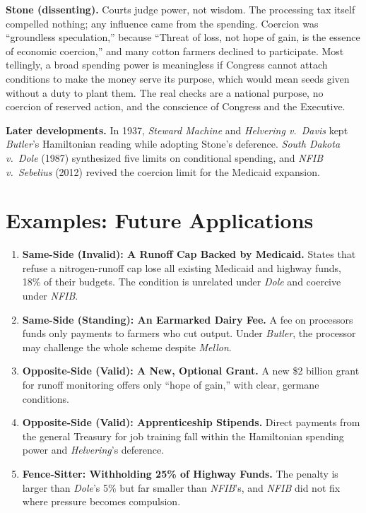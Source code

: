 \documentclass[12pt]{article}
\begin{document}
\textbf{Stone (dissenting).} Courts judge power, not wisdom. The processing tax itself compelled nothing; any influence came from the spending. Coercion was ``groundless speculation,'' because ``Threat of loss, not hope of gain, is the essence of economic coercion,'' and many cotton farmers declined to participate. Most tellingly, a broad spending power is meaningless if Congress cannot attach conditions to make the money serve its purpose, which would mean seeds given without a duty to plant them. The real checks are a national purpose, no coercion of reserved action, and the conscience of Congress and the Executive.

\textbf{Later developments.} In 1937, \textit{Steward Machine} and \textit{Helvering v.\ Davis} kept \textit{Butler}'s Hamiltonian reading while adopting Stone's deference. \textit{South Dakota v.\ Dole} (1987) synthesized five limits on conditional spending, and \textit{NFIB v.\ Sebelius} (2012) revived the coercion limit for the Medicaid expansion.

\section{Examples: Future Applications}

\begin{enumerate}
\item \textbf{Same-Side (Invalid): A Runoff Cap Backed by Medicaid.} States that refuse a nitrogen-runoff cap lose all existing Medicaid and highway funds, 18\% of their budgets. The condition is unrelated under \textit{Dole} and coercive under \textit{NFIB}.
\item \textbf{Same-Side (Standing): An Earmarked Dairy Fee.} A fee on processors funds only payments to farmers who cut output. Under \textit{Butler}, the processor may challenge the whole scheme despite \textit{Mellon}.
\item \textbf{Opposite-Side (Valid): A New, Optional Grant.} A new \$2 billion grant for runoff monitoring offers only ``hope of gain,'' with clear, germane conditions.
\item \textbf{Opposite-Side (Valid): Apprenticeship Stipends.} Direct payments from the general Treasury for job training fall within the Hamiltonian spending power and \textit{Helvering}'s deference.
\item \textbf{Fence-Sitter: Withholding 25\% of Highway Funds.} The penalty is larger than \textit{Dole}'s 5\% but far smaller than \textit{NFIB}'s, and \textit{NFIB} did not fix where pressure becomes compulsion.
\end{enumerate}
\end{document}
